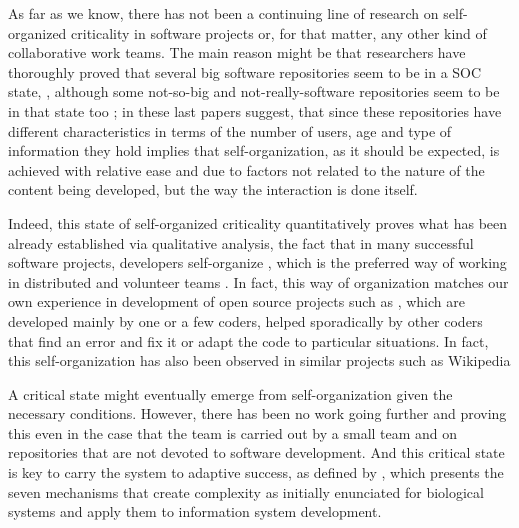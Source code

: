 \documentclass[conference]{IEEEtran}
\begin{document}
\cite{merelo2017self,arafat2009commit,merelo16:self}


As far as we know, there has not been a continuing line of research on
self-organized criticality in software projects or, for that matter,
any other kind of collaborative work teams. The main reason might be
that researchers have thoroughly
proved that several big software repositories seem to be in a SOC state,
\cite{wu2007empirical,gorshenev2004punctuated}, although some
not-so-big and not-really-software repositories seem to be in that
state too \cite{Merelo2016:repomining,merelo16:slash,merelo16:self};
in these last papers suggest, that since these repositories have different characteristics in terms
of the number of users, age and type of information they hold implies that
self-organization, as it should be expected, is achieved with relative
ease and due to factors not related to the nature of the content being
developed, but the way the interaction is done itself. 

Indeed, this state of self-organized criticality
quantitatively proves what has been already established via
qualitative analysis, the fact that in many successful software
projects, developers self-organize \cite{Crowston2007564}, 
which is
the preferred way of working in distributed and volunteer
teams \cite{crowston2012free}. In fact, this way of organization
matches our own experience in development of open source projects such
as \cite{ae09,2016arXiv160101607M}, which are developed mainly by one
or a few coders, helped sporadically by other coders that find an
error and fix it or adapt the code to particular situations. 
In fact, this self-organization has also been observed in similar
projects such as Wikipedia \cite{10.1371/journal.pone.0017333}

A critical state might eventually emerge from self-organization
given the necessary conditions. However, there has been no work going further and
proving this even in the case that the team is carried out by a small team and
on repositories that are not devoted to software development. And this
critical state is key to carry the system to adaptive success, as
defined by \cite{benbya2006toward}, which presents 
the seven mechanisms that create complexity as initially enunciated for
biological systems and apply them to information system
development. 
\end{document}
